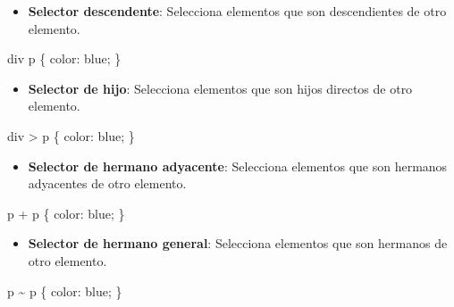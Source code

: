\documentclass[
  a4paper,
  DIV=11,
  numbers=noendperiod,
  onepage,
  openany]{scrreprt}
\newenvironment{Shaded}{\begin{snugshade}}{\end{snugshade}}
\newcommand{\ConstantTok}[1]{\textcolor[rgb]{0.56,0.35,0.01}{#1}}
\newcommand{\KeywordTok}[1]{\textcolor[rgb]{0.00,0.23,0.31}{#1}}
\newcommand{\NormalTok}[1]{\textcolor[rgb]{0.00,0.23,0.31}{#1}}
\newcommand{\OperatorTok}[1]{\textcolor[rgb]{0.37,0.37,0.37}{#1}}
\providecommand{\tightlist}{%
  \setlength{\itemsep}{0pt}\setlength{\parskip}{0pt}}\usepackage{longtable,booktabs,array}
\begin{document}
\begin{itemize}
\tightlist
\item
  \textbf{Selector descendente}: Selecciona elementos que son
  descendientes de otro elemento.
\end{itemize}

\begin{Shaded}
\begin{Highlighting}[]
\NormalTok{div p \{}
  \KeywordTok{color}\NormalTok{: }\ConstantTok{blue}\OperatorTok{;}
\NormalTok{\}}
\end{Highlighting}
\end{Shaded}

\begin{itemize}
\tightlist
\item
  \textbf{Selector de hijo}: Selecciona elementos que son hijos directos
  de otro elemento.
\end{itemize}

\begin{Shaded}
\begin{Highlighting}[]
\NormalTok{div }\OperatorTok{\textgreater{}}\NormalTok{ p \{}
  \KeywordTok{color}\NormalTok{: }\ConstantTok{blue}\OperatorTok{;}
\NormalTok{\}}
\end{Highlighting}
\end{Shaded}

\begin{itemize}
\tightlist
\item
  \textbf{Selector de hermano adyacente}: Selecciona elementos que son
  hermanos adyacentes de otro elemento.
\end{itemize}

\begin{Shaded}
\begin{Highlighting}[]
\NormalTok{p }\OperatorTok{+}\NormalTok{ p \{}
  \KeywordTok{color}\NormalTok{: }\ConstantTok{blue}\OperatorTok{;}
\NormalTok{\}}
\end{Highlighting}
\end{Shaded}

\begin{itemize}
\tightlist
\item
  \textbf{Selector de hermano general}: Selecciona elementos que son
  hermanos de otro elemento.
\end{itemize}

\begin{Shaded}
\begin{Highlighting}[]
\NormalTok{p }\OperatorTok{\textasciitilde{}}\NormalTok{ p \{}
  \KeywordTok{color}\NormalTok{: }\ConstantTok{blue}\OperatorTok{;}
\NormalTok{\}}
\end{Highlighting}
\end{Shaded}
\end{document}
